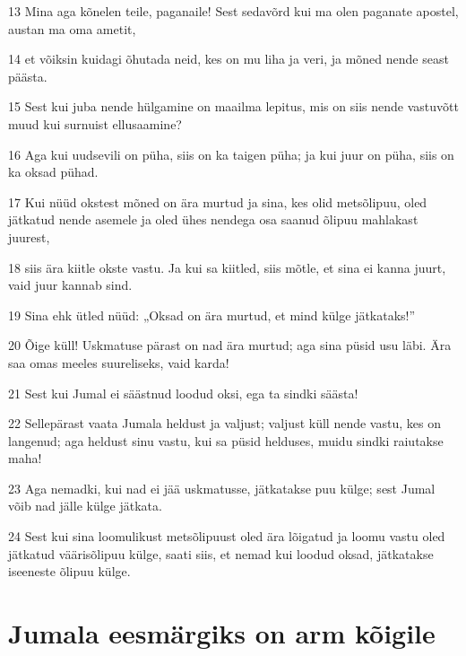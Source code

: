 \par 13 Mina aga kõnelen teile, paganaile! Sest sedavõrd kui ma olen paganate apostel, austan ma oma ametit,
\par 14 et võiksin kuidagi õhutada neid, kes on mu liha ja veri, ja mõned nende seast päästa.
\par 15 Sest kui juba nende hülgamine on maailma lepitus, mis on siis nende vastuvõtt muud kui surnuist ellusaamine?
\par 16 Aga kui uudsevili on püha, siis on ka taigen püha; ja kui juur on püha, siis on ka oksad pühad.
\par 17 Kui nüüd okstest mõned on ära murtud ja sina, kes olid metsõlipuu, oled jätkatud nende asemele ja oled ühes nendega osa saanud õlipuu mahlakast juurest,
\par 18 siis ära kiitle okste vastu. Ja kui sa kiitled, siis mõtle, et sina ei kanna juurt, vaid juur kannab sind.
\par 19 Sina ehk ütled nüüd: „Oksad on ära murtud, et mind külge jätkataks!”
\par 20 Õige küll! Uskmatuse pärast on nad ära murtud; aga sina püsid usu läbi. Ära saa omas meeles suureliseks, vaid karda!
\par 21 Sest kui Jumal ei säästnud loodud oksi, ega ta sindki säästa!
\par 22 Sellepärast vaata Jumala heldust ja valjust; valjust küll nende vastu, kes on langenud; aga heldust sinu vastu, kui sa püsid helduses, muidu sindki raiutakse maha!
\par 23 Aga nemadki, kui nad ei jää uskmatusse, jätkatakse puu külge; sest Jumal võib nad jälle külge jätkata.
\par 24 Sest kui sina loomulikust metsõlipuust oled ära lõigatud ja loomu vastu oled jätkatud väärisõlipuu külge, saati siis, et nemad kui loodud oksad, jätkatakse iseeneste õlipuu külge.

\section*{Jumala eesmärgiks on arm kõigile}

